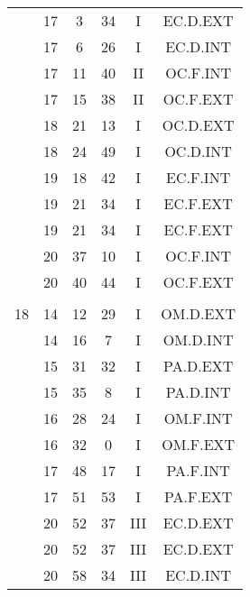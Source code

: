 \documentclass[12pt, a4paper]{article}
\begin{document}
\begin{multicols}{3}
{\begin{tabular}{c c c c c c}
	 	 	 	 & 17 & 3 & 34 & I & EC.D.EXT\\%
	 	 	 	 & 17 & 6 & 26 & I & EC.D.INT\\%
	 	 	 	 & 17 & 11 & 40 & II & OC.F.INT\\%
	 	 	 	 & 17 & 15 & 38 & II & OC.F.EXT\\%
	 	 	 	 & 18 & 21 & 13 & I & OC.D.EXT\\%
	 	 	 	 & 18 & 24 & 49 & I & OC.D.INT\\%
	 	 	 	 & 19 & 18 & 42 & I & EC.F.INT\\%
	 	 	 	 & 19 & 21 & 34 & I & EC.F.EXT\\%
	 	 	 	 & 19 & 21 & 34 & I & EC.F.EXT\\%
	 	 	 	 & 20 & 37 & 10 & I & OC.F.INT\\%
	 	 	 	 & 20 & 40 & 44 & I & OC.F.EXT\\%
	 	 	 	 & & & & & \\%
	 	 	 	18 & 14 & 12 & 29 & I & OM.D.EXT\\%
	 	 	 	 & 14 & 16 & 7 & I & OM.D.INT\\%
	 	 	 	 & 15 & 31 & 32 & I & PA.D.EXT\\%
	 	 	 	 & 15 & 35 & 8 & I & PA.D.INT\\%
	 	 	 	 & 16 & 28 & 24 & I & OM.F.INT\\%
	 	 	 	 & 16 & 32 & 0 & I & OM.F.EXT\\%
	 	 	 	 & 17 & 48 & 17 & I & PA.F.INT\\%
	 	 	 	 & 17 & 51 & 53 & I & PA.F.EXT\\%
	 	 	 	 & 20 & 52 & 37 & III & EC.D.EXT\\%
	 	 	 	 & 20 & 52 & 37 & III & EC.D.EXT\\%
	 	 	 	 & 20 & 58 & 34 & III & EC.D.INT\\%

\end{tabular}}
\end{multicols}
\end{document}

